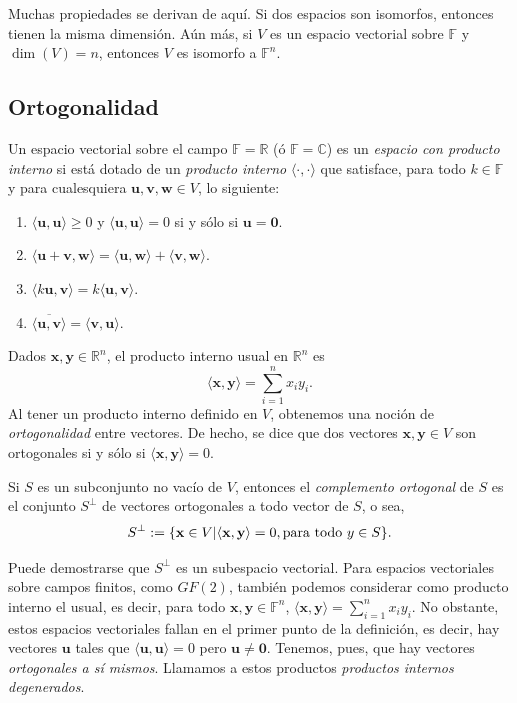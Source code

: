             Muchas propiedades se derivan de aquí. Si dos espacios son isomorfos, entonces tienen la misma dimensión. Aún más, si $V$ es un espacio vectorial sobre $\mathbb{F}$ y $\dim(V) =n$, entonces $V$ es isomorfo a $\mathbb{F}^{n}$.


        \subsection{Ortogonalidad}
            Un espacio vectorial sobre el campo $\mathbb{F}=\mathbb{R}$ (ó $\mathbb{F}=\mathbb{C}$) es un \textit{espacio con producto interno} si está dotado de un \textit{producto interno} $\langle \cdot{,} \cdot \rangle$ que satisface, para todo $k \in \mathbb{F}$ y para cualesquiera $\mathbf{u,v,w} \in V$, lo siguiente:
                \begin{enumerate}
                    \item $\langle \mathbf{u,u}\rangle \geq 0$ y $\langle \mathbf{u,u}\rangle = 0$ si y sólo si $\mathbf{u} = \mathbf{0}$.
                    \item $\langle \mathbf{u+v,w} \rangle = \langle \mathbf{u,w} \rangle + \langle \mathbf{v,w}\rangle$.
                    \item $ \langle k\mathbf{u,v}\rangle =  k\langle \mathbf{u,v}\rangle$.
                    \item $\overline{ \langle \mathbf{u,v}\rangle} =  \langle \mathbf{v,u}\rangle$.
                \end{enumerate}

            Dados $\mathbf{x,y} \in \mathbb{R}^{n}$, el producto interno usual en $\mathbb{R}^{n}$ es $$ \langle \mathbf{x,y}\rangle = \sum_{i = 1}^{n} x_{i}y_{i}.$$
            Al tener un producto interno definido en $V$, obtenemos una noción de \textit{ortogonalidad} entre vectores. De hecho, se dice que dos vectores $\mathbf{x,y} \in V$ son ortogonales si y sólo si $ \langle \mathbf{x,y}\rangle =0$.

            Si $S$ es un subconjunto no vacío de $V$, entonces el \textit{complemento ortogonal} de $S$ es el conjunto $S^{\perp}$ de vectores ortogonales a todo vector de $S$, o sea, $$S^{\perp}:= \{\mathbf{x} \in V |  \langle \mathbf{x,y}\rangle = 0, \textnormal{para todo } y \in S\}.$$

            Puede demostrarse que $S^{\perp}$ es un subespacio vectorial. Para espacios vectoriales sobre campos finitos, como $GF(2)$, también podemos considerar como producto interno el usual, es decir, para todo $\mathbf{x,y} \in \mathbb{F}^{n}$, $ \langle \mathbf{x,y}\rangle =  \sum_{i = 1}^{n} x_{i}y_{i}$. No obstante, estos espacios vectoriales fallan en el primer punto de la definición, es decir, hay vectores $\mathbf{u}$ tales que $\langle \mathbf{u,u}\rangle = 0$ pero $\mathbf{u}\neq \mathbf{0}$. Tenemos, pues, que hay vectores \textit{ortogonales a sí mismos}. Llamamos a estos productos \textit{productos internos degenerados}. 

